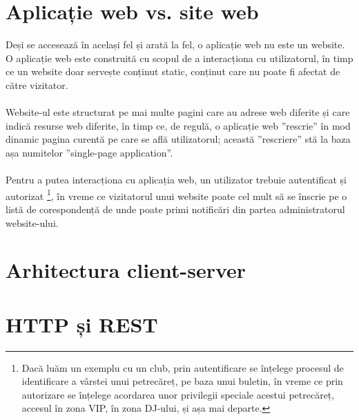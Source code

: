 
\section{Aplicație web vs. site web}
Deși se accesează în același fel și arată la fel, o aplicație web nu este un website.\\
O aplicație web este construită cu scopul de a interacționa cu utilizatorul, în timp ce un website doar servește conținut static, conținut care nu poate fi afectat de către vizitator.
\\ \\
Website-ul este structurat pe mai multe pagini care au adrese web diferite și care indică resurse web diferite, în timp ce, de regulă, o aplicație web ”rescrie” în mod dinamic pagina curentă pe care se află utilizatorul; această ”rescriere” stă la baza așa numitelor ”single-page application”.
\\ \\
Pentru a putea interacționa cu aplicația web, un utilizator trebuie autentificat și autorizat \footnote{Dacă luăm un exemplu cu un club, prin autentificare se înțelege procesul de identificare a vârstei unui petrecăreț, pe baza unui buletin, în vreme ce prin autorizare se înțelege acordarea unor privilegii speciale acestui petrecăreț, accesul în zona VIP, în zona DJ-ului, și așa mai departe.}, în vreme ce vizitatorul unui website poate cel mult să se înscrie pe o listă de corespondență de unde poate primi notificări din partea administratorul website-ului.


\section{Arhitectura client-server}


\section{HTTP și REST}

